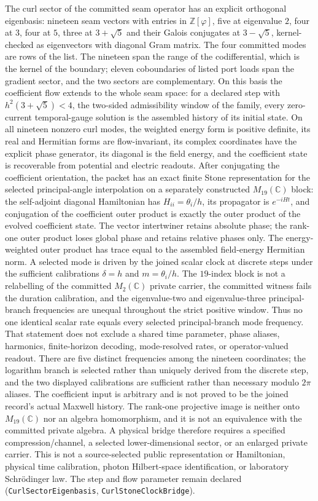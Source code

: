 \documentclass[11pt]{article}
\begin{document}
The curl sector of the committed seam operator has an explicit orthogonal
eigenbasis: nineteen seam vectors with entries in \(\mathbb Z[\varphi]\),
five at eigenvalue \(2\), four at \(3\), four at \(5\), three at
\(3+\sqrt5\) and their Galois conjugates at \(3-\sqrt5\), kernel-checked as
eigenvectors with diagonal Gram matrix. The four committed modes are rows of
the list. The nineteen span the range of the codifferential, which is the
kernel of the boundary; eleven coboundaries of listed port loads span the
gradient sector, and the two sectors are complementary. On this basis the
coefficient flow extends to the whole seam space: for a declared step with
\(h^2(3+\sqrt5) < 4\), the two-sided admissibility window of the family,
every zero-current temporal-gauge solution is the assembled history of its
initial state. On all nineteen nonzero curl modes, the weighted energy form
is positive definite, its real and Hermitian forms are flow-invariant, its
complex coordinates have the explicit phase generator, its diagonal is the
field energy, and the coefficient state is recoverable from potential and
electric readouts.  After conjugating the coefficient orientation, the packet
has an exact finite Stone representation for the selected principal-angle
interpolation on a separately constructed
$M_{19}(\mathbb C)$ block: the self-adjoint diagonal Hamiltonian has
$H_{ii}=\theta_i/h$, its propagator is $e^{-iH t}$, and conjugation of
the coefficient outer product is exactly the outer product of the evolved
coefficient state.  The vector intertwiner retains absolute phase; the
rank-one outer product loses global phase and retains relative phases only.
The energy-weighted outer product has trace equal to the assembled
field-energy Hermitian norm.  A selected mode is driven by the joined scalar
clock at discrete steps under the sufficient calibrations $\delta=h$ and
$m=\theta_i/h$.  The $19$-index block is not a
relabelling of the committed $M_2(\mathbb C)$ private carrier, the committed
witness fails the duration calibration, and the eigenvalue-two and
eigenvalue-three principal-branch frequencies are unequal throughout the
strict positive window.  Thus no one identical scalar rate equals every
selected principal-branch mode frequency.  That statement does not exclude a
shared time parameter, phase aliases, harmonics, finite-horizon decoding,
mode-resolved rates, or operator-valued readout.  There are five distinct
frequencies among the nineteen coordinates; the logarithm branch is selected
rather than uniquely derived from the discrete step, and the two displayed
calibrations are sufficient rather than necessary modulo $2\pi$ aliases.  The
coefficient input is arbitrary and is not proved to be the joined record's
actual Maxwell history.  The rank-one projective image is neither onto
$M_{19}(\mathbb C)$ nor an algebra homomorphism, and it is not an equivalence
with the committed private algebra.  A physical bridge therefore
requires a specified compression/channel, a selected lower-dimensional
sector, or an enlarged private carrier.  This is not a source-selected public
representation or Hamiltonian, physical time calibration, photon
Hilbert-space identification, or laboratory Schr\"odinger law.  The step and
flow parameter remain declared
(\texttt{CurlSectorEigenbasis},
\texttt{CurlStoneClockBridge}).
\end{document}
